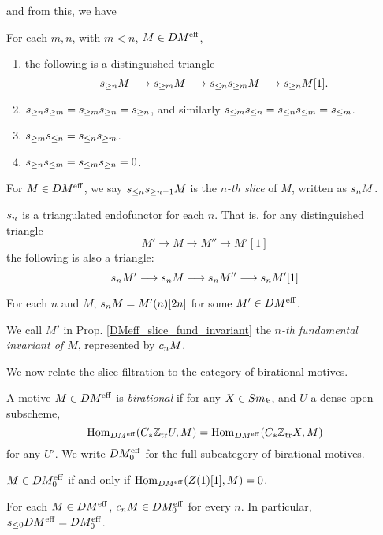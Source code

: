 and from this, we have

\begin{prop}
For each $m, n$, with $m < n$, $M \in DM^{\mathrm{eff}}$,

\begin{enumerate}
\item the following is a distinguished triangle
\begin{equation}
s_{\geq n}M \longrightarrow s_{\geq m}M \longrightarrow s_{\leq n}s_{\geq m}M \longrightarrow s_{\geq n}M[1].
\end{equation}

\item $s_{\geq n}s_{\geq m} = s_{\geq m}s_{\geq n} = s_{\geq n}$, and 
similarly $s_{\leq m}s_{\leq n} = s_{\leq n}s_{\leq m} = s_{\leq m}$.

\item $s_{\geq m}s_{\leq n} = s_{\leq n}s_{\geq m}$.

\item $s_{\geq n}s_{\leq m} = s_{\leq m}s_{\geq n} = 0$.
\end{enumerate}
\end{prop}

\begin{definition}
For $M \in DM^{\mathrm{eff}}$, we say $s_{\leq n}s_{\geq n - 1}M$ is the 
\emph{$n$-th slice} of $M$, written as $s_{n}M$.
\end{definition}

\begin{prop}
$s_{n}$ is a triangulated endofunctor for each $n$. That is,
for any distinguished triangle
\[
M' \to M \to M'' \to M'[1]
\]
the following is also a triangle:
\[
s_{n}M' \longrightarrow s_{n}M \longrightarrow s_{n}M'' \longrightarrow s_{n}M'[1]
\]
\end{prop}

\begin{prop}\label{DMeff_slice_fund_invariant}
For each $n$ and $M$, $s_{n}M = M'(n)[2n]$ for some $M' \in
DM^{\mathrm{eff}}$.
\end{prop}

\begin{definition}
We call $M'$ in Prop. \ref{DMeff_slice_fund_invariant} the 
\emph{$n$-th fundamental invariant of $M$}, represented by
$c_{n}M$.
\end{definition}

We now relate the slice filtration to the category of birational
motives.

\begin{definition}
A motive $M \in DM^{\mathrm{eff}}$ is \emph{birational} if for any $X \in 
Sm_k$, and $U$ a dense open subscheme,
\[
\mathrm{Hom}_{DM^{\mathrm{eff}}}(C_*\mathbb{Z}_{\mathrm{tr}}{U}, M) = \mathrm{Hom}_{DM^{\mathrm{eff}}}(C_*\mathbb{Z}_{\mathrm{tr}}{X}, M)
\]
for any $U'$. We write $DM^{\mathrm{eff}}_0$ for the full subcategory of
birational motives.
\end{definition}

\begin{prop}
$M \in DM^{\mathrm{eff}}_0$ if and only if $\mathrm{Hom}_{DM^{\mathrm{eff}}}(Z(1)[1], M) = 0$.
\end{prop}

\begin{prop}
For each $M \in DM^{\mathrm{eff}}$, $c_{n}M \in DM^{\mathrm{eff}}_0$ for every $n$.
In particular, $s_{\leq 0}DM^{\mathrm{eff}} = DM^{\mathrm{eff}}_0$.
\end{prop}

